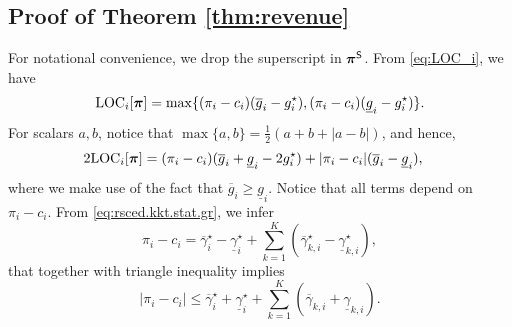 \subsection{Proof of Theorem \ref{thm:revenue}}
\label{app:proof.thm.revenue}
For notational convenience, we drop the superscript in ${\bm{\pi}}^{{\sf S}}$. From \eqref{eq:LOC_i}, we have
{\small \begin{equation}
\begin{aligned}
  {\rm LOC}_i[{\bm{\pi}}] = \max\{
  (\pi_i - c_i) (\overline{g}_i - g_i^\star), 
  (\pi_i - c_i) (\underline{g}_i - g_i^\star) \}.
\end{aligned}
\end{equation}}
For scalars $a, b$, notice that $\max\{a, b\} = \frac{1}{2}\left({a + b + | a - b |}\right)$, and hence,
{\small \begin{equation}
\begin{aligned}
  2{\rm LOC}_i[{\bm{\pi}}] 
  &= {(\pi_i - c_i) (\overline{g}_i + \underline{g}_i - 2 g_i^\star) + | \pi_i - c_i | (\overline{g}_i - \underline{g}_i)},
  \label{eq:revenue.loc}
\end{aligned}
\end{equation}}
where we make use of the fact that $\overline{g}_i \ge \underline{g}_i$. 
Notice that all terms depend on $\pi_i - c_i$. 
From \eqref{eq:rsced.kkt.stat.gr}, we infer
{\small 
\begin{equation}
    \pi_i - c_i = \overline{\gamma}^{\star}_i - \underline{\gamma}^{\star}_i + \sum_{k = 1}^K \left( \overline{\gamma}^{\star}_{k,i} - \underline{\gamma}^{\star}_{k,i} \right),
    \label{eq:revenue.diff}
\end{equation}}
that together with triangle inequality implies
{\small \begin{equation}
    | \pi_i - c_i | \le \overline{\gamma}^{\star}_i + \underline{\gamma}^{\star}_i + \sum_{k = 1}^K \left( \overline{\gamma}_{k,i} + \underline{\gamma}_{k,i} \right).
    \label{eq:revenue.absdiff}
\end{equation}}
